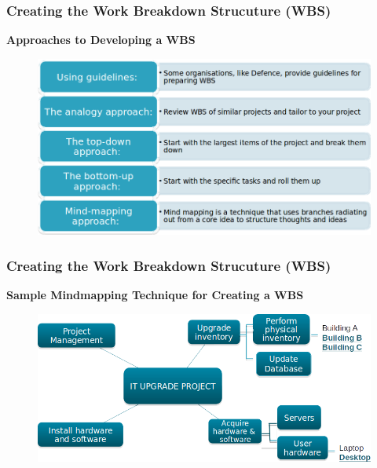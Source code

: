\documentclass{beamer}
\begin{document}

\begin{frame}
\frametitle{Creating the Work Breakdown Strucuture (WBS)}
\textbf{Approaches to Developing a WBS}
\vspace{0.5cm}
\begin{figure}
\includegraphics[scale=0.5]{wbs_approaches}
\end{figure}
\end{frame}


\begin{frame}
\frametitle{Creating the Work Breakdown Strucuture (WBS)}
\textbf{Sample Mindmapping Technique for Creating a WBS}
\vspace{0.5cm}
\begin{figure}
\includegraphics[scale=0.5]{mindmap_wbs}
\end{figure}
\end{frame}

\end{document}
